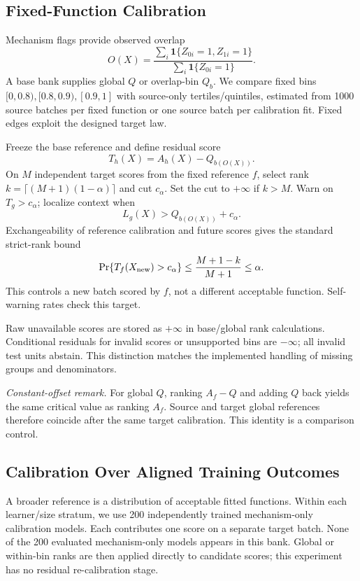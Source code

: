 \documentclass[conference]{IEEEtran}
\begin{document}
\subsection{Fixed-Function Calibration}
Mechanism flags provide observed overlap
\begin{equation}
 O(X)=\frac{\sum_i\mathbf1\{Z_{0i}=1,Z_{1i}=1\}}{\sum_i\mathbf1\{Z_{0i}=1\}}.
\end{equation}
A base bank supplies global $Q$ or overlap-bin $Q_b$. We compare fixed bins $[0,0.8),[0.8,0.9),[0.9,1]$ with source-only tertiles/quintiles, estimated from 1000 source batches per fixed function or one source batch per calibration fit. Fixed edges exploit the designed target law.

Freeze the base reference and define residual score
\begin{equation}
 T_h(X)=A_h(X)-Q_{b(O(X))}.
\end{equation}
On $M$ independent target scores from the fixed reference $f$, select rank $k=\lceil(M+1)(1-\alpha)\rceil$ and cut $c_\alpha$. Set the cut to $+\infty$ if $k>M$. Warn on $T_g>c_\alpha$; localize context when
\begin{equation}
 L_g(X)>Q_{b(O(X))}+c_\alpha.
 \label{eq:localization}
\end{equation}
Exchangeability of reference calibration and future scores gives the standard strict-rank bound
\begin{equation}
 \Pr\{T_f(X_{\rm new})>c_\alpha\}\leq\frac{M+1-k}{M+1}\leq\alpha.
 \label{eq:rank}
\end{equation}
This controls a new batch scored by $f$, not a different acceptable function. Self-warning rates check this target.

Raw unavailable scores are stored as $+\infty$ in base/global rank calculations. Conditional residuals for invalid scores or unsupported bins are $-\infty$; all invalid test units abstain. This distinction matches the implemented handling of missing groups and denominators.

\textit{Constant-offset remark.} For global $Q$, ranking $A_f-Q$ and adding $Q$ back yields the same critical value as ranking $A_f$. Source and target global references therefore coincide after the same target calibration. This identity is a comparison control.

\subsection{Calibration Over Aligned Training Outcomes}
A broader reference is a distribution of acceptable fitted functions. Within each learner/size stratum, we use 200 independently trained mechanism-only calibration models. Each contributes one score on a separate target batch. None of the 200 evaluated mechanism-only models appears in this bank. Global or within-bin ranks are then applied directly to candidate scores; this experiment has no residual re-calibration stage.
\end{document}
